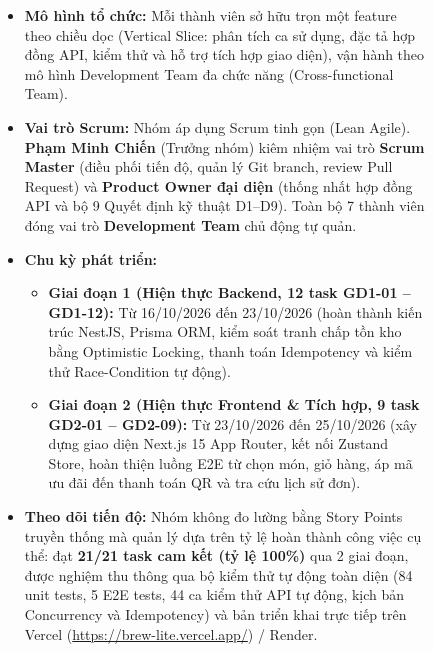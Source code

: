 \documentclass[12pt,a4paper,oneside]{report}
\begin{document}
\begin{figure}[H]
\centering
\begin{tcolorbox}[colback=gray!5,colframe=gray!50,title=Ghi nhận tiến độ và số liệu thực tế của Nhóm]
\begin{itemize}[leftmargin=1.5cm]
  \item \textbf{Mô hình tổ chức:} Mỗi thành viên sở hữu trọn một feature theo chiều dọc (Vertical Slice: phân tích ca sử dụng, đặc tả hợp đồng API, kiểm thử và hỗ trợ tích hợp giao diện), vận hành theo mô hình Development Team đa chức năng (Cross-functional Team).
  
  \item \textbf{Vai trò Scrum:} Nhóm áp dụng Scrum tinh gọn (Lean Agile). \textbf{Phạm Minh Chiến} (Trưởng nhóm) kiêm nhiệm vai trò \textbf{Scrum Master} (điều phối tiến độ, quản lý Git branch, review Pull Request) và \textbf{Product Owner đại diện} (thống nhất hợp đồng API và bộ 9 Quyết định kỹ thuật D1--D9). Toàn bộ 7 thành viên đóng vai trò \textbf{Development Team} chủ động tự quản.
  
  \item \textbf{Chu kỳ phát triển:}
  \begin{itemize}
    \item \textbf{Giai đoạn 1 (Hiện thực Backend, 12 task GD1-01 -- GD1-12):} Từ 16/10/2026 đến 23/10/2026 (hoàn thành kiến trúc NestJS, Prisma ORM, kiểm soát tranh chấp tồn kho bằng Optimistic Locking, thanh toán Idempotency và kiểm thử Race-Condition tự động).
    \item \textbf{Giai đoạn 2 (Hiện thực Frontend \& Tích hợp, 9 task GD2-01 -- GD2-09):} Từ 23/10/2026 đến 25/10/2026 (xây dựng giao diện Next.js 15 App Router, kết nối Zustand Store, hoàn thiện luồng E2E từ chọn món, giỏ hàng, áp mã ưu đãi đến thanh toán QR và tra cứu lịch sử đơn).
  \end{itemize}
  
  \item \textbf{Theo dõi tiến độ:} Nhóm không đo lường bằng Story Points truyền thống mà quản lý dựa trên tỷ lệ hoàn thành công việc cụ thể: đạt \textbf{21/21 task cam kết (tỷ lệ 100\%)} qua 2 giai đoạn, được nghiệm thu thông qua bộ kiểm thử tự động toàn diện (84 unit tests, 5 E2E tests, 44 ca kiểm thử API tự động, kịch bản Concurrency và Idempotency) và bản triển khai trực tiếp trên Vercel (\url{https://brew-lite.vercel.app/}) / Render.
  

\end{itemize}
\end{tcolorbox}
\end{figure}
\end{document}
